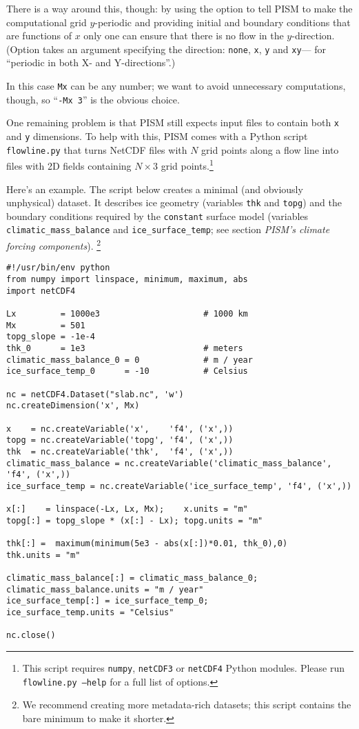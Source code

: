 There is a way around this, though: by using the 
option to tell PISM to make the computational grid $y$-periodic and providing
initial and boundary conditions that are functions of $x$ only one can ensure
that there is no flow in the $y$-direction. (Option 
takes an argument specifying the direction: \texttt{none}, \texttt{x},
\texttt{y} and \texttt{xy}--- for ``periodic in both X- and Y-directions''.)

In this case \texttt{Mx} can be any number; we want to avoid unnecessary
computations, though, so ``\texttt{-Mx 3}'' is the obvious choice.

One remaining problem is that PISM still expects input files to contain both
\texttt{x} and \texttt{y} dimensions. To help with this, PISM comes with a
Python script \texttt{flowline.py} that turns NetCDF files with $N$ grid points
along a flow line into files with 2D fields containing $N\times3$ grid
points.\footnote{This script requires \texttt{numpy}, \texttt{netCDF3} or
  \texttt{netCDF4} Python modules. Please run \texttt{flowline.py --help} for a
  full list of options.}

Here's an example. The script below creates a minimal (and obviously
unphysical) dataset. It describes ice geometry (variables \texttt{thk} and
\texttt{topg}) and the boundary conditions required by the \texttt{constant}
surface model (variables \texttt{climatic_mass_balance} and
\texttt{ice_surface_temp}; see section \emph{PISM's climate forcing components}). \footnote{We recommend creating more metadata-rich
  datasets; this script contains the bare minimum to make it shorter.}
\begin{verbatim}
#!/usr/bin/env python
from numpy import linspace, minimum, maximum, abs
import netCDF4

Lx         = 1000e3                     # 1000 km
Mx         = 501
topg_slope = -1e-4
thk_0      = 1e3                        # meters
climatic_mass_balance_0 = 0             # m / year
ice_surface_temp_0      = -10           # Celsius

nc = netCDF4.Dataset("slab.nc", 'w')
nc.createDimension('x', Mx)

x    = nc.createVariable('x',    'f4', ('x',))
topg = nc.createVariable('topg', 'f4', ('x',))
thk  = nc.createVariable('thk',  'f4', ('x',))
climatic_mass_balance = nc.createVariable('climatic_mass_balance', 'f4', ('x',))
ice_surface_temp = nc.createVariable('ice_surface_temp', 'f4', ('x',))

x[:]    = linspace(-Lx, Lx, Mx);    x.units = "m"
topg[:] = topg_slope * (x[:] - Lx); topg.units = "m"

thk[:] =  maximum(minimum(5e3 - abs(x[:])*0.01, thk_0),0)
thk.units = "m"

climatic_mass_balance[:] = climatic_mass_balance_0;
climatic_mass_balance.units = "m / year"
ice_surface_temp[:] = ice_surface_temp_0;
ice_surface_temp.units = "Celsius"

nc.close()
\end{verbatim}

